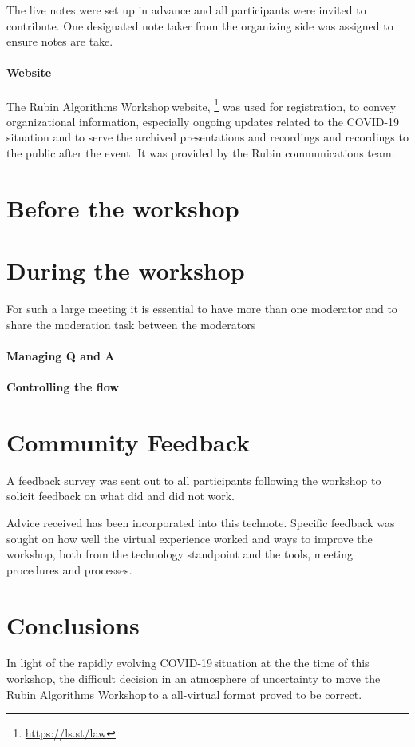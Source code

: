 \documentclass[DM,authoryear,toc]{lsstdoc}
\newcommand{\cvd}{COVID-19\,}
\newcommand{\raw}{Rubin Algorithms Workshop\,}
\begin{document}
The live notes were set up in advance and all participants were invited to contribute.  
One designated note taker from the organizing side was assigned to ensure notes are take. 

\paragraph{Website}
The \raw website, \footnote{\url{https://ls.st/law}\label{law}} was used for registration, to convey  organizational information, especially ongoing updates related to the \cvd situation and to serve the archived presentations and recordings and recordings to the public after the event. It was provided by the Rubin communications team. 


\section{Before the workshop}


\section{During the workshop}

For such a large meeting it is essential to have more than one moderator and to share the moderation task between the moderators 

\paragraph{Managing Q and A}

\paragraph{Controlling the flow}


\section{Community Feedback}
A feedback survey was sent out to all participants following the workshop to solicit feedback on what did and did not work.  

Advice received has been incorporated into this technote.  
Specific feedback was sought on how well the virtual experience worked and ways to improve the workshop, both from the technology standpoint and the tools, meeting procedures and processes. 

\section{Conclusions}
In light of the rapidly evolving \cvd situation at the the time of this workshop, the difficult decision in an atmosphere of uncertainty to move the \raw to a all-virtual format proved to be correct. 
\end{document}
